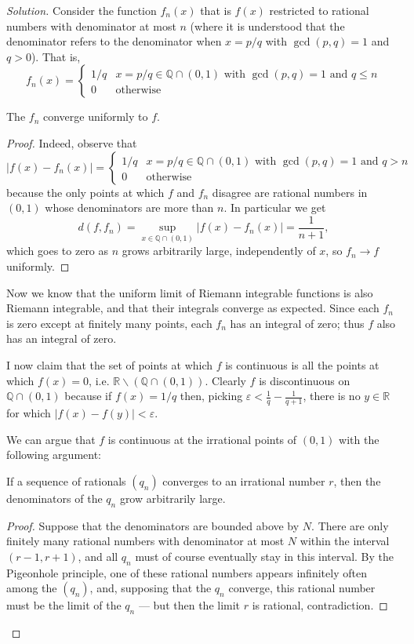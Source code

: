 \documentclass[11pt]{scrartcl}
\providecommand{\eps}{\varepsilon}
\providecommand{\QQ}{\mathbb Q}
\providecommand{\RR}{\mathbb R}
\providecommand{\setdiff}{\smallsetminus}
\newenvironment{soln}{\begin{proof}[Solution]}{\end{proof}}
\begin{document}
\begin{soln}
	Consider the function $f_n(x)$ that is $f(x)$
	restricted to rational numbers with denominator at most $n$
	(where it is understood that the denominator refers to
	the denominator when $x = p/q$ with $\gcd(p, q) = 1$ and $q > 0$).
	That is,
	\[f_n(x) = \begin{cases}
		1/q & x = p/q\in\QQ\cap(0,1)\text{ with }\gcd(p,q) = 1
		\text{ and }q\le n\\
		0 & \text{otherwise}
	\end{cases}\]

	\begin{claim}
		The $f_n$ converge uniformly to $f$.
	\end{claim}
	\begin{proof}
		Indeed, observe that
		\[|f(x) - f_n(x)| = \begin{cases}
			1/q & x = p/q\in\QQ\cap(0,1)\text{ with }\gcd(p,q) = 1
			\text{ and }q> n\\
			0 & \text{otherwise}
		\end{cases}\]
		because the only points at which $f$ and $f_n$ disagree
		are rational numbers in $(0,1)$ whose denominators
		are more than $n$.
		In particular we get
		\[d(f, f_n) = \sup_{x\in\QQ\cap(0,1)} |f(x) - f_n(x)| =\frac 1{n+1},\]
		which goes to zero as $n$ grows arbitrarily large,
		independently of $x$, so $f_n\to f$ uniformly.
	\end{proof}
	
	Now we know that the uniform limit of Riemann integrable functions
	is also Riemann integrable, and that their integrals converge as expected.
	Since each $f_n$ is zero except at finitely many points,
	each $f_n$ has an integral of zero; thus $f$ also has an integral of zero.
	
	I now claim that the set of points at which $f$ is continuous is
	all the points at which $f(x) = 0$, i.e. $\RR\setdiff(\QQ\cap(0,1))$.
	Clearly $f$ is discontinuous on $\QQ\cap(0,1)$ because
	if $f(x) = 1/q$ then, picking $\eps < \frac 1q - \frac 1{q+1}$,
	there is no $y\in\RR$ for which $|f(x) - f(y)| < \eps$.
	
	We can argue that $f$ is continuous at the irrational points of $(0,1)$
	with the following argument:
	\begin{claim}
		If a sequence of rationals $(q_n)$ converges to
		an irrational number $r$, then the denominators of the $q_n$
		grow arbitrarily large.
	\end{claim}
	\begin{proof}
		Suppose that the denominators are bounded above by $N$.
		There are only finitely many rational numbers with denominator
		at most $N$ within the interval $(r - 1, r + 1)$,
		and all $q_n$ must of course eventually stay in this interval.
		By the Pigeonhole principle, one of these rational numbers
		appears infinitely often among the $(q_n)$, and, supposing that
		the $q_n$ converge, this rational number must be the limit
		of the $q_n$ --- but then the limit $r$ is rational, contradiction.
	\end{proof}
	

\end{soln}
\end{document}
